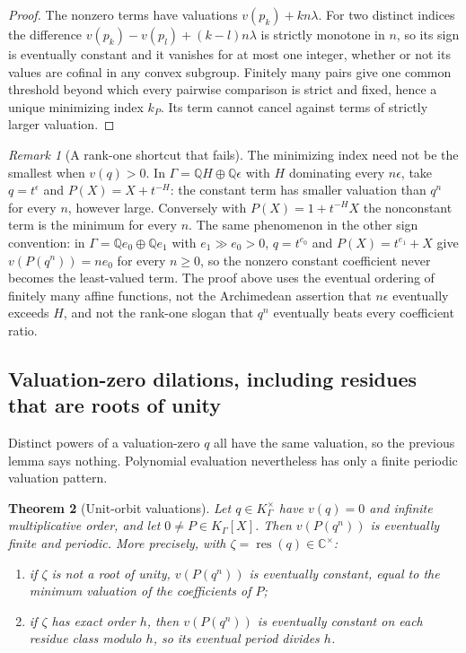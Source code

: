 \documentclass[11pt]{article}
\numberwithin{equation}{section}
\newtheorem{theorem}{Theorem}[section]
\theoremstyle{definition}
\theoremstyle{remark}
\newtheorem{remark}[theorem]{Remark}
\newcommand{\C}{\mathbb C}
\newcommand{\Q}{\mathbb Q}
\newcommand{\K}{K_\Gamma}
\newcommand{\res}{\operatorname{res}}
\begin{document}
\begin{proof}
The nonzero terms have valuations $v(p_k)+kn\lambda$. For two distinct indices
the difference $v(p_k)-v(p_l)+(k-l)n\lambda$ is strictly monotone in $n$, so
its sign is eventually constant and it vanishes for at most one integer,
whether or not its values are cofinal in any convex subgroup. Finitely many
pairs give one common threshold beyond which every pairwise comparison is
strict and fixed, hence a unique minimizing index $k_P$. Its term cannot
cancel against terms of strictly larger valuation.
\end{proof}

\begin{remark}[A rank-one shortcut that fails]\label{hol:rem:shortcut}
The minimizing index need not be the smallest when $v(q)>0$. In
$\Gamma=\Q H\oplus\Q\epsilon$ with $H$ dominating every $n\epsilon$, take
$q=t^\epsilon$ and $P(X)=X+t^{-H}$: the constant term has smaller valuation
than $q^n$ for every $n$, however large. Conversely with $P(X)=1+t^{-H}X$ the
nonconstant term is the minimum for every $n$. The same phenomenon in the
other sign convention: in $\Gamma=\Q e_0\oplus\Q e_1$ with $e_1\gg e_0>0$,
$q=t^{e_0}$ and $P(X)=t^{e_1}+X$ give $v(P(q^n))=ne_0$ for every $n\ge0$, so
the nonzero constant coefficient never becomes the least-valued term. The
proof above uses the eventual ordering of finitely many affine functions, not
the Archimedean assertion that $n\epsilon$ eventually exceeds $H$, and not the
rank-one slogan that $q^n$ eventually beats every coefficient ratio.
\end{remark}

\subsection{Valuation-zero dilations, including residues that are roots of unity}

Distinct powers of a valuation-zero $q$ all have the same valuation, so the
previous lemma says nothing. Polynomial evaluation nevertheless has only a
finite periodic valuation pattern.

\begin{theorem}[Unit-orbit valuations]\label{hol:thm:unitorbit}
Let $q\in\K^\times$ have $v(q)=0$ and infinite multiplicative order, and let
$0\ne P\in\K[X]$. Then $v(P(q^n))$ is eventually finite and periodic. More
precisely, with $\zeta=\res(q)\in\C^\times$:
\begin{enumerate}[label=\textup{(\alph*)}]
\item if $\zeta$ is not a root of unity, $v(P(q^n))$ is eventually constant,
equal to the minimum valuation of the coefficients of $P$;
\item if $\zeta$ has exact order $h$, then $v(P(q^n))$ is eventually constant
on each residue class modulo $h$, so its eventual period divides $h$.
\end{enumerate}
\end{theorem}
\end{document}
